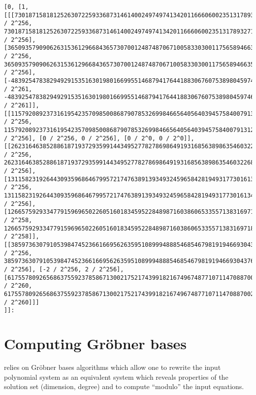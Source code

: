 \documentclass[a4paper,english,11pt]{scrartcl}
\theoremstyle{definition}
\theoremstyle{remark}
\begin{document}
\begin{tcolorbox}
  \begin{lstlisting}
[0, [1,
[[[73018715818125263072259336873146140024974974134201166606002351317893271212110 / 2^256, 73018715818125263072259336873146140024974974134201166606002351317893271212112 / 2^256], [36509357909062631536129668436573070012487487067100583303001175658946635606055 / 2^256, 36509357909062631536129668436573070012487487067100583303001175658946635606056 / 2^256], [-483925478382949291535163019801669955146879417644188306760753898045974604548584 / 2^261, -483925478382949291535163019801669955146879417644188306760753898045974604548583 / 2^261]], [[115792089237316195423570985008687907853269984665640564039457584007913129639936 / 2^256, 115792089237316195423570985008687907853269984665640564039457584007913129639936 / 2^256], [0 / 2^256, 0 / 2^256], [0 / 2^0, 0 / 2^0]], [[26231646385288618719372935991443495277827869864919316856389863546032268479240 / 2^256, 26231646385288618719372935991443495277827869864919316856389863546032268479285 / 2^256], [13115823192644309359686467995721747638913934932459658428194931773016134239626 / 2^256, 13115823192644309359686467995721747638913934932459658428194931773016134239637 / 2^256], [126657592933477915969650226051601834595228489871603860653355713831697185362822 / 2^258, 126657592933477915969650226051601834595228489871603860653355713831697185362823 / 2^258]], [[38597363079105398474523661669562635951089994888546854679819194669304376546640 / 2^256, 38597363079105398474523661669562635951089994888546854679819194669304376546651 / 2^256], [-2 / 2^256, 2 / 2^256], [617557809265686375592378586713002175217439918216749674877107114708870024746325 / 2^260, 617557809265686375592378586713002175217439918216749674877107114708870024746326 / 2^260]]]
]]:
  \end{lstlisting}
\end{tcolorbox}


\section{Computing Gr\"obner bases}\label{sec:grobner}

\msolve relies on Gr\"obner bases algorithms which allow one to rewrite the
input polynomial system as an equivalent system which reveals properties of the
solution set (dimension, degree) and to compute ``modulo'' the input equations.
\end{document}

